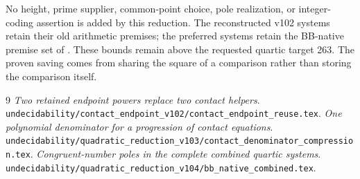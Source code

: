 \documentclass[11pt]{article}
\begin{document}
No height, prime supplier, common-point choice, pole realization,
or integer-coding assertion is added by this reduction. The
reconstructed v102 systems retain their old arithmetic premises;
the preferred systems retain the BB-native premise set of
\cite{bb}. These bounds remain above the requested quartic target
263. The proven saving comes from sharing the square of a
comparison rather than storing the comparison itself.

\begin{thebibliography}{9}
 \emph{Two retained endpoint powers replace two contact
helpers}.
\nolinkurl{undecidability/contact_endpoint_v102/contact_endpoint_reuse.tex}.
 \emph{One polynomial denominator for a progression of
contact equations}.
\nolinkurl{undecidability/quadratic_reduction_v103/contact_denominator_compression.tex}.
 \emph{Congruent-number poles in the complete combined
quartic systems}.
\nolinkurl{undecidability/quadratic_reduction_v104/bb_native_combined.tex}.
\end{thebibliography}
\end{document}
